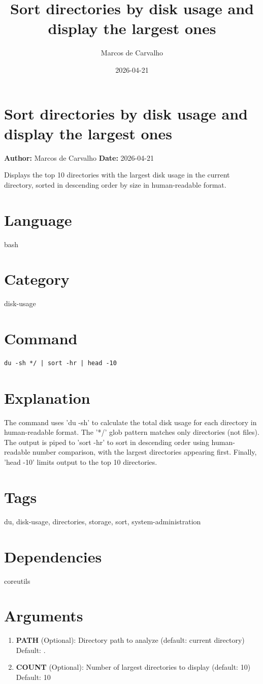 \documentclass{article}
\title{Sort directories by disk usage and display the largest ones}
\author{Marcos de Carvalho}
\date{2026-04-21}
\begin{document}
\section*{Sort directories by disk usage and display the largest ones}
\textbf{Author:} Marcos de Carvalho \hfill \textbf{Date:} 2026-04-21

\noindent Displays the top 10 directories with the largest disk usage in the current directory, sorted in descending order by size in human-readable format.

\section*{Language}
bash

\section*{Category}
disk-usage

\section*{Command}
\begin{lstlisting}
du -sh */ | sort -hr | head -10
\end{lstlisting}

\section*{Explanation}
The command uses 'du -sh' to calculate the total disk usage for each directory in human-readable format. The '*/' glob pattern matches only directories (not files). The output is piped to 'sort -hr' to sort in descending order using human-readable number comparison, with the largest directories appearing first. Finally, 'head -10' limits output to the top 10 directories.

\section*{Tags}
du, disk-usage, directories, storage, sort, system-administration

\section*{Dependencies}
coreutils


\section*{Arguments}
\begin{enumerate}
  \item \textbf{PATH} (Optional): Directory path to analyze (default: current directory) \\ Default: .
  \item \textbf{COUNT} (Optional): Number of largest directories to display (default: 10) \\ Default: 10
\end{enumerate}
\end{document}
